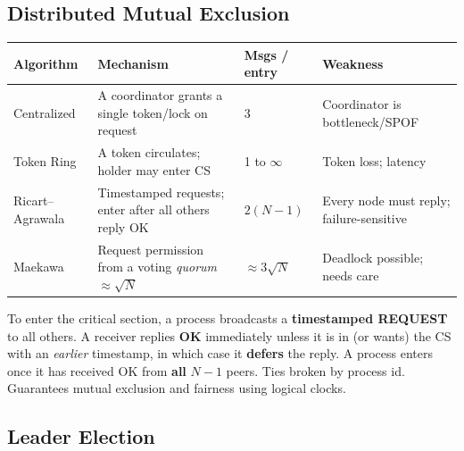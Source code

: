 \documentclass[11pt,a4paper]{article}
\begin{document}
\subsection{Distributed Mutual Exclusion}
\begin{longtable}{@{}p{3.3cm}p{5.6cm}p{2.4cm}p{2.1cm}@{}}
\toprule
\rowcolor{primary!15}
\textbf{Algorithm} & \textbf{Mechanism} & \textbf{Msgs / entry} & \textbf{Weakness} \\
\midrule
\endhead
Centralized & A coordinator grants a single token/lock on request & 3 & Coordinator is bottleneck/SPOF \\
Token Ring & A token circulates; holder may enter CS & 1 to $\infty$ & Token loss; latency \\
Ricart--Agrawala & Timestamped requests; enter after all others reply OK & $2(N{-}1)$ & Every node must reply; failure-sensitive \\
Maekawa & Request permission from a voting \emph{quorum} $\approx \sqrt{N}$ & $\approx 3\sqrt{N}$ & Deadlock possible; needs care \\
\bottomrule
\end{longtable}

\begin{conceptbox}
To enter the critical section, a process broadcasts a \textbf{timestamped REQUEST} to all others. A receiver replies \textbf{OK} immediately unless it is in (or wants) the CS with an \emph{earlier} timestamp, in which case it \textbf{defers} the reply. A process enters once it has received OK from \textbf{all} $N{-}1$ peers. Ties broken by process id. Guarantees mutual exclusion and fairness using logical clocks.
\end{conceptbox}

\subsection{Leader Election}
\begin{center}
\end{center}
\end{document}
